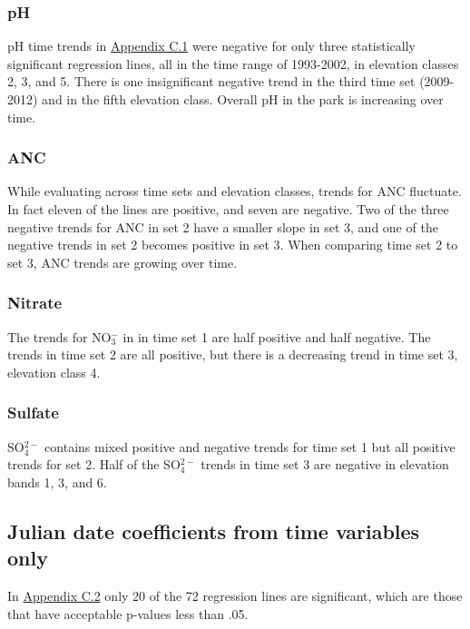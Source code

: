 \subsubsection{pH}

pH time trends in \hyperref[sec:SWJD]{Appendix C.1} were negative for only three statistically significant regression lines, all in the time range of 1993-2002, in elevation classes 2, 3, and 5.   
There is one insignificant negative trend in the third time set (2009-2012) and in the fifth elevation class.   
Overall pH in the park is increasing over time.

\subsubsection{ANC}

While evaluating across time sets and elevation classes, trends for ANC fluctuate.
In fact eleven of the lines are positive, and seven are negative.   
Two of the three negative trends for ANC in set 2 have a smaller slope in set 3, and one of the negative trends in set 2 becomes positive in set 3.  
When comparing time set 2 to set 3, ANC trends are growing over time. 

\subsubsection{Nitrate}

The trends for NO$_3^-$ in in time set 1 are half positive and half negative.
The trends in time set 2 are all positive, but there is a decreasing trend in time set 3, elevation class 4. 

\subsubsection{Sulfate}

SO$_4^{2-}$ contains mixed positive and negative trends for time set 1 but all positive trends for set 2. 
Half of the SO$_4^{2-}$ trends in time set 3 are negative in elevation bands 1, 3, and 6.

\subsection{Julian date coefficients from time variables only}

In \hyperref[sec:TVJD]{Appendix C.2} only 20 of the 72 regression lines are significant,  which are those that have acceptable p-values less than .05.


